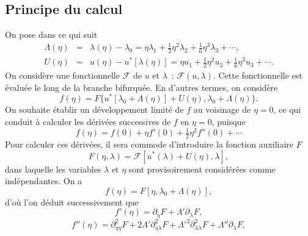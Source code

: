\documentclass{article}
\newcommand{\nocomma}{}
\begin{document}
\subsection{Principe du calcul}\label{sec20220107121442}

On pose dans ce qui suit
\begin{eqnarray}
  \Lambda (\eta) & = & \lambda (\eta) - \lambda_0 = \eta \lambda_1 +
  \tfrac{1}{2} \eta^2 \lambda_2 + \tfrac{1}{6} \eta^3 \lambda_3 + \cdots,
  \label{eq20211112155446}\\
  U (\eta) & = & u (\eta) - u^{\ast} [\lambda (\eta)] = \eta u_1 +
  \tfrac{1}{2} \eta^2 u_2 + \tfrac{1}{6} \eta^3 u_3 + \cdots .
  \label{eq20211112113028}
\end{eqnarray}
On consid{\`e}re une fonctionnelle $\mathcal{F}$ de $u$ et $\lambda$~:
$\mathcal{F} (u, \lambda)$. Cette fonctionnelle est {\'e}valu{\'e}e le long de
la branche bifurqu{\'e}e. En d'autres termes, on consid{\`e}re
\begin{equation}
  f (\eta) = F \{ u^{\ast} [\lambda_0 + \Lambda (\eta)] + U (\eta), \lambda_0
  + \Lambda (\eta) \} .
\end{equation}
On souhaite {\'e}tablir un d{\'e}veloppement limit{\'e} de $f$ au voisinage de
$\eta = 0$, ce qui conduit {\`a} calculer les d{\'e}riv{\'e}es successives de
$f$ en $\eta = 0$, puisque
\begin{equation}
  f (\eta) = f (0) + \eta f' (0) + \tfrac{1}{2} \eta^2 f'' (0) + \cdots
\end{equation}
Pour calculer ces d{\'e}riv{\'e}es, il sera commode d'introduire la fonction
auxiliaire $F$
\begin{equation}
  F (\eta, \lambda) =\mathcal{F} [u^{\ast} (\lambda) + U (\eta), \lambda],
\end{equation}
dans laquelle les variables $\lambda$ et $\eta$ sont provisoirement
consid{\'e}r{\'e}es comme ind{\'e}pendantes. On a
\begin{equation}
  f (\eta) = F [\eta, \lambda_0 + \Lambda (\eta)],
\end{equation}
d'o{\`u} l'on d{\'e}duit successivement que
\begin{equation}
  \label{eq20211112162417} f' (\eta) = \partial_{\eta} F + \Lambda'
  \partial_{\lambda} F,
\end{equation}
\begin{equation}
  \label{eq20211112165810} f'' (\eta) = \partial_{\eta \nocomma \eta}^2 F + 2
  \Lambda' \partial_{\eta \nocomma \lambda}^2 {F + \Lambda'}^2
  \partial_{\lambda \nocomma \lambda}^2 F + \Lambda'' \partial_{\lambda} F,
\end{equation}
\end{document}
